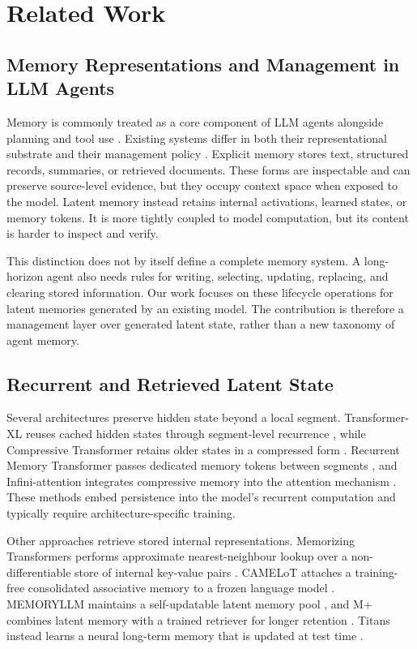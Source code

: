 \section{Related Work}
\label{sec:related-work}

\subsection{Memory Representations and Management in LLM Agents}

Memory is commonly treated as a core component of LLM agents alongside planning and tool use \cite{zhao2023llm_agent_survey,wang2024survey_autonomous_agents}. Existing systems differ in both their representational substrate and their management policy \cite{zhang2024survey_memory_llm_agents}. Explicit memory stores text, structured records, summaries, or retrieved documents. These forms are inspectable and can preserve source-level evidence, but they occupy context space when exposed to the model. Latent memory instead retains internal activations, learned states, or memory tokens. It is more tightly coupled to model computation, but its content is harder to inspect and verify.

This distinction does not by itself define a complete memory system. A long-horizon agent also needs rules for writing, selecting, updating, replacing, and clearing stored information. Our work focuses on these lifecycle operations for latent memories generated by an existing model. The contribution is therefore a management layer over generated latent state, rather than a new taxonomy of agent memory.

\subsection{Recurrent and Retrieved Latent State}

Several architectures preserve hidden state beyond a local segment. Transformer-XL reuses cached hidden states through segment-level recurrence \cite{dai2019transformerxl}, while Compressive Transformer retains older states in a compressed form \cite{rae2019compressive}. Recurrent Memory Transformer passes dedicated memory tokens between segments \cite{bulatov2022rmt}, and Infini-attention integrates compressive memory into the attention mechanism \cite{munkhdalai2024infini}. These methods embed persistence into the model's recurrent computation and typically require architecture-specific training.

Other approaches retrieve stored internal representations. Memorizing Transformers performs approximate nearest-neighbour lookup over a non-differentiable store of internal key-value pairs \cite{wu2022memorizing}. CAMELoT attaches a training-free consolidated associative memory to a frozen language model \cite{he2024camelot}. MEMORYLLM maintains a self-updatable latent memory pool \cite{wang2024memoryllm}, and M+ combines latent memory with a trained retriever for longer retention \cite{wang2025mplus}. Titans instead learns a neural long-term memory that is updated at test time \cite{behrouz2025titans}.

